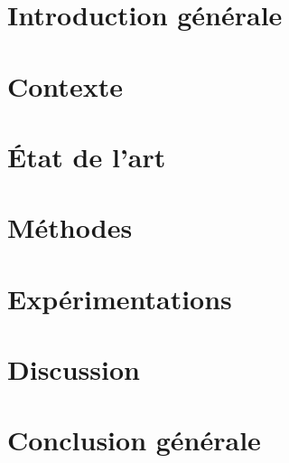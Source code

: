 \documentclass[a4paper,11pt,twoside]{memoir}
\newcommand{\nocontentsline}[3]{}
\newcommand{\tocless}[2]{\bgroup\let\addcontentsline=\nocontentsline#1{#2}\egroup}
\begin{document}
\sloppy
\dominitoc

\newpage
\setcounter{tocdepth}{1}
\tocless\tableofcontents
\newpage
\listoffigures
\listoftables
\printnomenclature
\newpage


\chapter*{Introduction générale}
\adjustmtc
{} 



\chapter{Contexte}
\label{chap:05_contexte}
\adjustmtc
\minitoc


\chapter{État de l’art}
\label{chap:articles}
\minitoc


\chapter{Méthodes}
\label{methodes}
\minitoc


\chapter{Expérimentations}
\label{chap:08_experimentations}
\minitoc


\chapter{Discussion}
\label{chap:09_discussion}
\minitoc



\cleardoublepage{}
\chapter*{Conclusion générale}
\adjustmtc
{}



\cleardoublepage{}


\appendix
\cleardoublepage{}

\cleardoublepage
{}
\printindex
\end{document}
